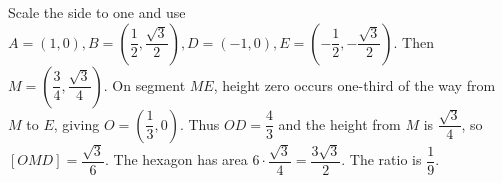 Scale the side to one and use $A=(1,0),B=(\dfrac{1}{2},\dfrac{\sqrt3}{2}),D=(-1,0),E=(-\dfrac{1}{2},-\dfrac{\sqrt3}{2})$. Then $M=(\dfrac{3}{4},\dfrac{\sqrt3}{4})$. On segment $ME$, height zero occurs one-third of the way from $M$ to $E$, giving $O=(\dfrac{1}{3},0)$. Thus $OD=\dfrac{4}{3}$ and the height from $M$ is $\dfrac{\sqrt3}{4}$, so $[OMD]=\dfrac{\sqrt3}{6}$. The hexagon has area $6\cdot\dfrac{\sqrt3}{4}=\dfrac{3\sqrt3}{2}$. The ratio is $\boxed{\dfrac{1}{9}}$.
